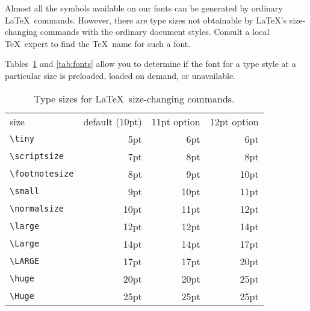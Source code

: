 Almost all the symbols available on our fonts can be generated by
ordinary \LaTeX\ commands.  However, there are type sizes not
obtainable by \LaTeX's size-changing commands with the ordinary
document styles.  Consult a local \TeX\ expert to find the
\TeX\ name for such a font.

Tables~\ref{tab:styles} and \ref{tab:fonts} allow you
to determine if the font for a type style at a particular
size is preloaded, loaded on demand, or unavailable.
\begin{table}
\centering
\begin{tabular}{l|r|r|r|}
\multicolumn{1}{l}{size} & 
\multicolumn{1}{c}{default (10pt)} &
        \multicolumn{1}{c}{11pt option}  &
        \multicolumn{1}{c}{12pt option}\\
\cline{2-4}
\verb|\tiny|       & 5pt  & 6pt & 6pt\\
\cline{2-4}
\verb|\scriptsize| & 7pt  & 8pt & 8pt\\
\cline{2-4}
\verb|\footnotesize| & 8pt & 9pt & 10pt \\
\cline{2-4}
\verb|\small|        & 9pt & 10pt & 11pt \\
\cline{2-4}
\verb|\normalsize| & 10pt & 11pt & 12pt \\
\cline{2-4}
\verb|\large|      & 12pt & 12pt & 14pt \\
\cline{2-4}
\verb|\Large|      & 14pt & 14pt & 17pt \\
\cline{2-4}
\verb|\LARGE|      & 17pt & 17pt & 20pt\\
\cline{2-4}
\verb|\huge|       & 20pt & 20pt & 25pt\\
\cline{2-4}
\verb|\Huge|       & 25pt & 25pt & 25pt\\
\cline{2-4}
\end{tabular}
\caption{Type sizes for \LaTeX\ size-changing commands.}\label{tab:styles}
\end{table}
